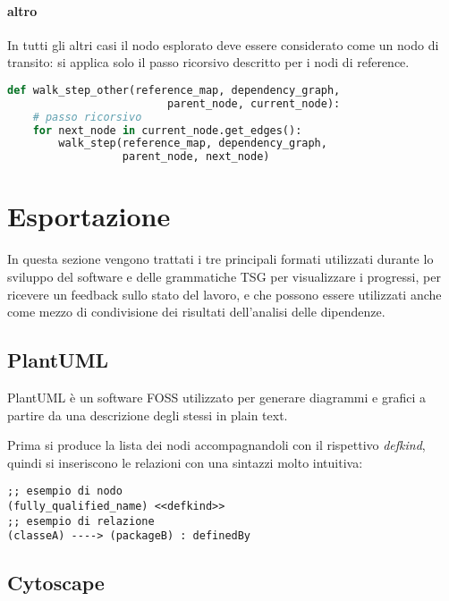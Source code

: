 \paragraph{altro}

In tutti gli altri casi il nodo esplorato deve essere considerato come un nodo di transito: si applica solo il passo ricorsivo descritto per i nodi di reference.

\begin{lstlisting}[language=Python, caption="Pseudocodice della procedura walk_step_other"]
def walk_step_other(reference_map, dependency_graph,
                         parent_node, current_node):
    # passo ricorsivo
    for next_node in current_node.get_edges():
        walk_step(reference_map, dependency_graph,
                  parent_node, next_node)
\end{lstlisting}

\section{Esportazione}

In questa sezione vengono trattati i tre principali formati utilizzati durante lo sviluppo del software e delle grammatiche TSG per visualizzare i progressi, per ricevere un feedback sullo stato del lavoro, e che possono essere utilizzati anche come mezzo di condivisione dei risultati dell'analisi delle dipendenze.

\subsection{PlantUML}

PlantUML \cite{PlantUML} \`e un software FOSS utilizzato per generare diagrammi e grafici a partire da una descrizione degli stessi in plain text.

Prima si produce la lista dei nodi accompagnandoli con il rispettivo \emph{defkind}, quindi si inseriscono le relazioni con una sintazzi molto intuitiva:

\begin{lstlisting}
;; esempio di nodo
(fully_qualified_name) <<defkind>>
;; esempio di relazione
(classeA) ----> (packageB) : definedBy
\end{lstlisting}

\subsection{Cytoscape}

